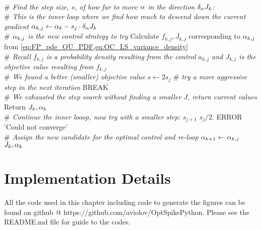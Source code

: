 \begin{algorithm}                     
\begin{algorithmic} [1]              
	\\ {\itshape $\#$ Find the step size, $s$, of how far to move $\alpha$ in the
	direction $\delta_\alpha J_k$:}
	\\ {\itshape $\#$ This is the inner loop where we find how much to descend down
	the current gradient}
	\State $\alpha_{k,j} \gets \alpha_{k} - s_j \cdot \delta_\alpha J_k  $
	\\ {\itshape $\#$ $\alpha_{k,j}$ is the new control strategy to try}
	\State Calculate $f_{k,j}, J_{k,j}$ corresponding to
		$\alpha_{k,j}$ from	\cref{eq:FP_pde_OU_PDF,eq:OC_LS_variance_density}
	\\ {\itshape $\#$ Recall $f_{k,j}$ is a probability density resulting from the
	control $a_{k,j}$ and $J_{k,j}$ is the objective value resulting from
	$f_{k,j}$}
		\\ {\itshape $\#$ We found a better (smaller) objective value}
		\State $s \gets 2 s_j$ {\itshape $\#$ try a more aggressive step in the
		next iteration}
		\State BREAK
		\EndIf
		\\ {\itshape $\#$ We exhausted the step search without finding a 
		smaller $J$, return current values}
		\State Return $J_k, \alpha_k$
	\EndIf
 	\\ {\itshape  $ \#$ Continue the inner looop, now try with a smaller step:}
	 	\State $s_{j+1}$ \gets $s_j / 2.$
		\State ERROR 'Could not converge'
	\EndIf
    \\{\itshape $\#$ Assign the new candidate for the optimal control and
    re-loop}
		\State $\alpha_{k+1} \gets \alpha_{k,j}$
\State \Return $J_k, \alpha_k$
\end{algorithmic}
\end{algorithm}
 

\section*{Implementation Details}
All the code used in this chapter including code to generate the figures
can be found on
{github @ https://github.com/aviolov/OptSpikePython}. Please see the README.md
file for guide to the codes.


